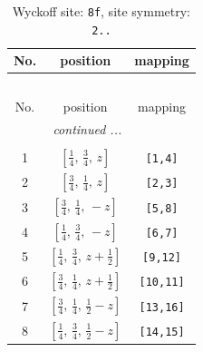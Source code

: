 \documentclass[fleqn,8pt]{jsarticle}
\begin{document}
\begin{longtable}{ccc}
\caption{Wyckoff site: {\tt 8f}, site symmetry: {\tt 2..}}
 \\
 \hline \hline
No. & position & mapping \\ \hline \endfirsthead

\multicolumn{2}{l}{\tablename\ \thetable{}} \\
 \hline \hline
No. & position & mapping \\ \hline \endhead

 \hline \hline
\multicolumn{2}{r}{\footnotesize\it continued ...} \\ \endfoot

 \hline \hline
\multicolumn{2}{r}{} \\ \endlastfoot

1 & $\left[ \frac{1}{4},\, \frac{3}{4},\, z \right]$ & {\tt [1,4]} \\ \hline
2 & $\left[ \frac{3}{4},\, \frac{1}{4},\, z \right]$ & {\tt [2,3]} \\ \hline
3 & $\left[ \frac{3}{4},\, \frac{1}{4},\, - z \right]$ & {\tt [5,8]} \\ \hline
4 & $\left[ \frac{1}{4},\, \frac{3}{4},\, - z \right]$ & {\tt [6,7]} \\ \hline
5 & $\left[ \frac{1}{4},\, \frac{3}{4},\, z + \frac{1}{2} \right]$ & {\tt [9,12]} \\ \hline
6 & $\left[ \frac{3}{4},\, \frac{1}{4},\, z + \frac{1}{2} \right]$ & {\tt [10,11]} \\ \hline
7 & $\left[ \frac{3}{4},\, \frac{1}{4},\, \frac{1}{2} - z \right]$ & {\tt [13,16]} \\ \hline
8 & $\left[ \frac{1}{4},\, \frac{3}{4},\, \frac{1}{2} - z \right]$ & {\tt [14,15]} \\
\end{longtable}
\renewcommand{\arraystretch}{1.2}
\end{document}
